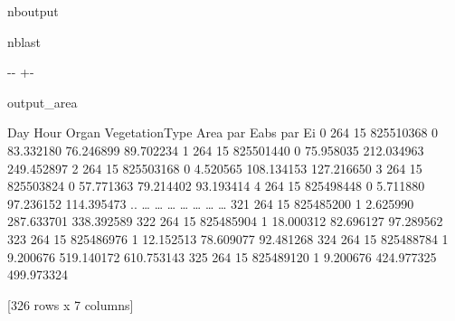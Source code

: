 \documentclass[letterpaper,10pt,english]{sphinxmanual}
\begin{document}
\begin{sphinxuseclass}{nboutput}
\begin{sphinxuseclass}{nblast}
{

\kern-\sphinxverbatimsmallskipamount\kern-\baselineskip
\kern+\FrameHeightAdjust\kern-\fboxrule
\vspace{\nbsphinxcodecellspacing}

\begin{sphinxuseclass}{output_area}
\begin{sphinxuseclass}{}


\begin{sphinxVerbatim}[commandchars=\\\{\}]
     Day  Hour      Organ  VegetationType       Area    par Eabs      par Ei
0    264    15  825510368               0  83.332180   76.246899   89.702234
1    264    15  825501440               0  75.958035  212.034963  249.452897
2    264    15  825503168               0   4.520565  108.134153  127.216650
3    264    15  825503824               0  57.771363   79.214402   93.193414
4    264    15  825498448               0   5.711880   97.236152  114.395473
..   {\ldots}   {\ldots}        {\ldots}             {\ldots}        {\ldots}         {\ldots}         {\ldots}
321  264    15  825485200               1   2.625990  287.633701  338.392589
322  264    15  825485904               1  18.000312   82.696127   97.289562
323  264    15  825486976               1  12.152513   78.609077   92.481268
324  264    15  825488784               1   9.200676  519.140172  610.753143
325  264    15  825489120               1   9.200676  424.977325  499.973324

[326 rows x 7 columns]
\end{sphinxVerbatim}



\end{sphinxuseclass}
\end{sphinxuseclass}
}

\end{sphinxuseclass}
\end{sphinxuseclass}
\end{document}
